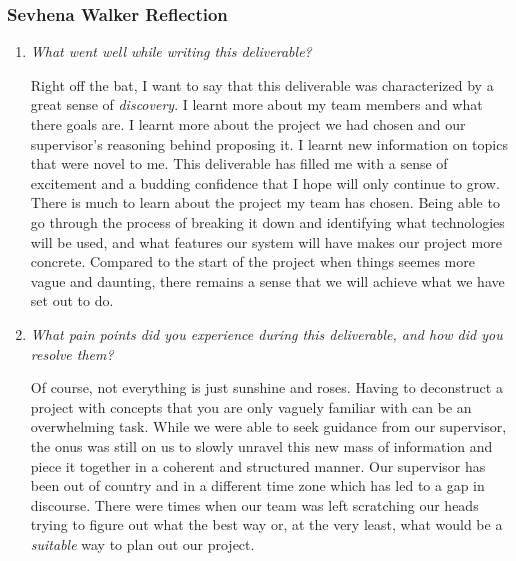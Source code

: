 \documentclass{article}
\begin{document}
\subsubsection*{Sevhena Walker Reflection}
\begin{enumerate}
  \item \textit{What went well while writing this deliverable?}

    Right off the bat, I want to say that this deliverable was
    characterized by a great sense of \textit{discovery}. I learnt
    more about my team members and what there goals are. I learnt
    more about the project we had chosen and our supervisor's
    reasoning behind proposing it. I learnt new information on topics
    that were novel to me. This deliverable has filled me with a
    sense of excitement and a budding confidence that I hope will
    only continue to grow. \\

    There is much to learn about the project my team has chosen.
    Being able to go through the process of breaking it down and
    identifying what technologies will be used, and what features our
    system will have makes our project more concrete. Compared to the
    start of the project when things seemes more vague and daunting,
    there remains a sense that we will achieve what we have set out to do.
  \item \textit{What pain points did you experience during this
    deliverable, and how did you resolve them?}

    Of course, not everything is just sunshine and roses. Having to
    deconstruct a project with concepts that you are only vaguely
    familiar with can be an overwhelming task. While we were able to
    seek guidance from our supervisor, the onus was still on us to
    slowly unravel this new mass of information and piece it together
    in a coherent and structured manner. Our supervisor has been out
    of country and in a different time zone which has led to a gap in
    discourse. There were times when our team was left scratching our
    heads trying to figure out what the best way or, at the very
    least, what would be a \textit{suitable} way to plan out our project.

\end{enumerate}
\end{document}
